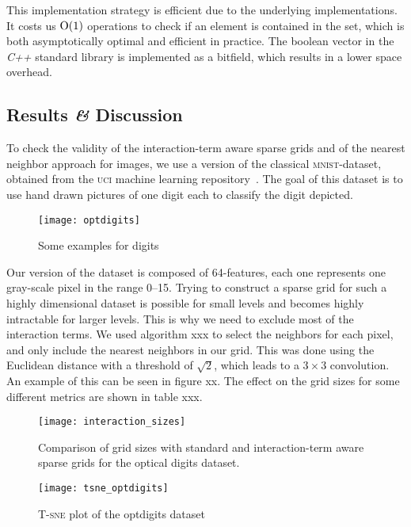 This implementation strategy is efficient due to the underlying implementations.
It costs us \(\operatorname{O}(1)\) operations to check if an element is contained in the set, which is both asymptotically optimal and efficient in practice.
The boolean vector in the \emph{C++} standard library is implemented as a
bitfield, which results in a lower space overhead.

\subsection{Results \textit{\&} Discussion}
To check the validity of the interaction-term aware sparse grids and of the
nearest neighbor approach for images, we use a version of the classical \textsc{mnist}-dataset, obtained from the
\textsc{uci} machine learning repository~\cite{datasets-uci}.
The goal of this dataset is to use hand drawn pictures of one digit each to
classify the digit depicted.
\begin{figure}[htb]
  \centering
  \texttt{[image: optdigits]}
  \caption{Some examples for digits}
  \label{fig:optdigit-images}
\end{figure}
Our version of the dataset is composed of 64-features, each one represents one
gray-scale pixel in the range 0--15.
Trying to construct a sparse grid for such a highly dimensional dataset is
possible for small levels and becomes highly intractable for larger levels.
This is why we need to exclude most of the interaction terms.
We used algorithm xxx to select the neighbors for each pixel, and only include
the nearest neighbors in our grid.
This was done using the Euclidean distance with a threshold of \(\sqrt{2}\),
which leads to a \(3 \times 3\) convolution.
An example of this can be seen in figure xx.
The effect on the grid sizes for some different metrics are shown in table xxx.

\begin{figure}[htb]
  \centering
  \texttt{[image: interaction\_sizes]}
  \caption{Comparison of grid sizes with standard and interaction-term aware
    sparse grids for the optical digits dataset.}
  \label{fig:optdigit-gridsize}
\end{figure}

\begin{figure}[htb]
  \centering
  \texttt{[image: tsne\_optdigits]}
  \caption{\textsc{T-sne} plot of the optdigits dataset}
  \label{fig:optdigit-tsne}
\end{figure}

